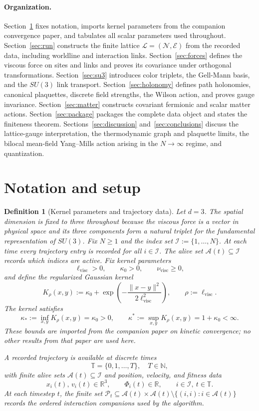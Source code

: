 \documentclass[11pt]{article}
\newtheorem{definition}[theorem]{Definition}
\theoremstyle{remark}
\newcommand{\R}{\mathbb R}
\newcommand{\N}{\mathbb N}
\newcommand{\Tset}{\mathbb T}
\newcommand{\mcN}{\mathcal N}
\newcommand{\mcE}{\mathcal E}
\begin{document}
\paragraph{Organization.}
Section~\ref{sec:notation} fixes notation, imports kernel parameters from the
companion convergence paper, and tabulates all scalar parameters used throughout.
Section~\ref{sec:run} constructs the finite lattice $\mathcal L=(\mcN,\mcE)$
from the recorded data, including worldline and interaction links.
Section~\ref{sec:forces} defines the viscous force on sites and links and proves
its covariance under orthogonal transformations.
Section~\ref{sec:su3} introduces color triplets, the Gell-Mann basis, and the
$SU(3)$ link transport.
Section~\ref{sec:holonomy} defines path holonomies, canonical plaquettes,
discrete field strengths, the Wilson action, and proves gauge invariance.
Section~\ref{sec:matter} constructs covariant fermionic and scalar matter actions.
Section~\ref{sec:package} packages the complete data object and states the finiteness
theorem.
Sections~\ref{sec:discussion} and~\ref{sec:conclusions} discuss the lattice-gauge
interpretation, the thermodynamic graph and plaquette limits, the bilocal
mean-field Yang--Mills action arising in the $N\to\infty$ regime, and quantization.

\section{Notation and setup}
\label{sec:notation}

\begin{definition}[Kernel parameters and trajectory data]
\label{def:imports}
Let $d=3$.
The spatial dimension is fixed to three throughout because the viscous force is
a vector in physical space and its three components form a natural triplet
for the fundamental representation of $SU(3)$.
Fix $N\ge1$ and the index set $\mathcal I:=\{1,\dots,N\}$.
At each time every trajectory entry is recorded for all $i\in\mathcal I$.
The alive set $\mathcal A(t)\subseteq\mathcal I$ records which indices are active.
Fix kernel parameters
\[
\ell_{\mathrm{visc}}>0,\qquad \kappa_0>0,\qquad \nu_{\mathrm{visc}}\ge0,
\]
and define the regularized Gaussian kernel
\[
K_\rho(x,y):=\kappa_0+\exp\!\left(-\frac{\|x-y\|^2}{2\ell_{\mathrm{visc}}^2}\right),
\qquad \rho:=\ell_{\mathrm{visc}}.
\]
The kernel satisfies
\[
\kappa_*:=\inf_{x,y}K_\rho(x,y)=\kappa_0>0,\qquad
\kappa^*:=\sup_{x,y}K_\rho(x,y)=1+\kappa_0<\infty.
\]
These bounds are imported from the companion paper on kinetic convergence;
no other results from that paper are used here.

A recorded trajectory is available at discrete times
\[
\Tset=\{0,1,\dots,T\},\quad T\in\N,
\]
with finite alive sets $\mathcal A(t)\subseteq\mathcal I$ and position,
velocity, and fitness data
\[
x_i(t),\,v_i(t)\in\R^3,\qquad \Phi_i(t)\in\R,\qquad i\in\mathcal I,\ t\in\Tset.
\]
At each timestep $t$, the finite set
$\mathcal P_t\subseteq \mathcal A(t)\times\mathcal A(t)\setminus\{(i,i):i\in\mathcal A(t)\}$
records the ordered interaction companions used by the algorithm.
\end{definition}
\end{document}
